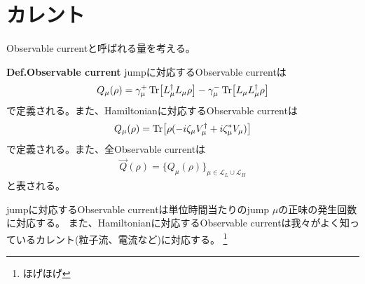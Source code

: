 \documentclass[a4paper,11pt]{jsarticle}
\numberwithin{equation}{section}
\begin{document}
\section{カレント}
Observable currentと呼ばれる量を考える。\\
\begin{itembox}[l]{\textbf{Def.Observable current}}
    jumpに対応するObservable currentは
    \begin{align}
        Q_{\mu}(\rho) = \gamma_{\mu}^{+} \Tr[L_{\mu}^{\dagger} L_{\mu} \rho] - \gamma_{\mu}^{-} \Tr[L_{\mu} L_{\mu}^{\dagger} \rho]
    \end{align}
    で定義される。また、Hamiltonianに対応するObservable currentは
    \begin{align}
        Q_{\mu}(\rho) = \Tr[\rho(-i\zeta_{\mu} V_{\mu}^{\dagger} + i\zeta_{\mu}^* V_{\mu})]
    \end{align}
    で定義される。また、全Observable currentは
    \begin{align}
        \vec{Q}(\rho) = \{Q_{\mu}(\rho)\}_{\mu \in \mathcal{L}_{L} \cup \mathcal{L}_{H}}
    \end{align}
    と表される。
\end{itembox}
jumpに対応するObservable currentは単位時間当たりのjump $\mu$の正味の発生回数に対応する。
また、Hamiltonianに対応するObservable currentは我々がよく知っているカレント(粒子流、電流など)に対応する。
\footnote{
    ほげほげ
}
\end{document}
